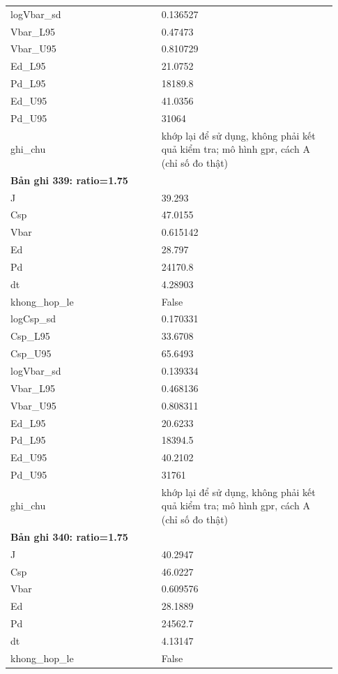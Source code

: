 \begin{longtable}{p{0.43\linewidth}p{0.50\linewidth}}
logVbar\_\allowbreak sd & 0.136527 \\
Vbar\_\allowbreak L95 & 0.47473 \\
Vbar\_\allowbreak U95 & 0.810729 \\
Ed\_\allowbreak L95 & 21.0752 \\
Pd\_\allowbreak L95 & 18189.8 \\
Ed\_\allowbreak U95 & 41.0356 \\
Pd\_\allowbreak U95 & 31064 \\
ghi\_\allowbreak chu & khớp lại để sử dụng, không phải kết quả kiểm tra; mô hình gpr, cách A (chỉ số đo thật) \\
\midrule
\multicolumn{2}{p{0.95\linewidth}}{\textbf{Bản ghi 339: ratio=1.75}} \\
J & 39.293 \\
Csp & 47.0155 \\
Vbar & 0.615142 \\
Ed & 28.797 \\
Pd & 24170.8 \\
dt & 4.28903 \\
khong\_\allowbreak hop\_\allowbreak le & False \\
logCsp\_\allowbreak sd & 0.170331 \\
Csp\_\allowbreak L95 & 33.6708 \\
Csp\_\allowbreak U95 & 65.6493 \\
logVbar\_\allowbreak sd & 0.139334 \\
Vbar\_\allowbreak L95 & 0.468136 \\
Vbar\_\allowbreak U95 & 0.808311 \\
Ed\_\allowbreak L95 & 20.6233 \\
Pd\_\allowbreak L95 & 18394.5 \\
Ed\_\allowbreak U95 & 40.2102 \\
Pd\_\allowbreak U95 & 31761 \\
ghi\_\allowbreak chu & khớp lại để sử dụng, không phải kết quả kiểm tra; mô hình gpr, cách A (chỉ số đo thật) \\
\midrule
\multicolumn{2}{p{0.95\linewidth}}{\textbf{Bản ghi 340: ratio=1.75}} \\
J & 40.2947 \\
Csp & 46.0227 \\
Vbar & 0.609576 \\
Ed & 28.1889 \\
Pd & 24562.7 \\
dt & 4.13147 \\
khong\_\allowbreak hop\_\allowbreak le & False \\

\end{longtable}
